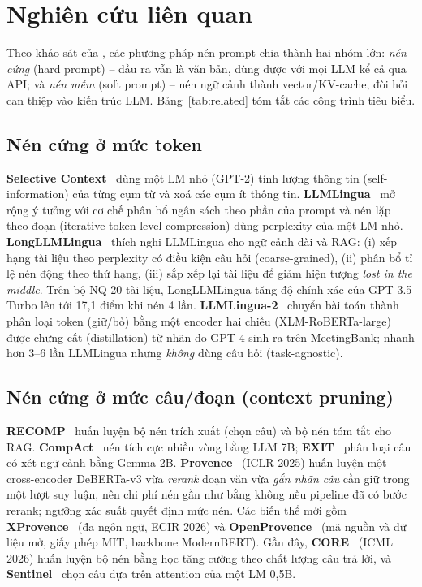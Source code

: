 \section{Nghiên cứu liên quan}
\label{sec:related}

Theo khảo sát của \citet{li2025survey}, các phương pháp nén prompt chia thành hai nhóm lớn:
\emph{nén cứng} (hard prompt) -- đầu ra vẫn là văn bản, dùng được với mọi LLM kể cả qua API; và
\emph{nén mềm} (soft prompt) -- nén ngữ cảnh thành vector/KV-cache, đòi hỏi can thiệp vào kiến trúc
LLM. Bảng~\ref{tab:related} tóm tắt các công trình tiêu biểu.

\subsection{Nén cứng ở mức token}

\textbf{Selective Context}~\cite{li2023selective} dùng một LM nhỏ (GPT-2) tính lượng thông tin
(self-information) của từng cụm từ và xoá các cụm ít thông tin. \textbf{LLMLingua}~\cite{jiang2023llmlingua}
mở rộng ý tưởng với cơ chế phân bổ ngân sách theo phần của prompt và nén lặp theo đoạn (iterative
token-level compression) dùng perplexity của một LM nhỏ. \textbf{LongLLMLingua}~\cite{jiang2024longllmlingua}
thích nghi LLMLingua cho ngữ cảnh dài và RAG: (i) xếp hạng tài liệu theo perplexity có điều kiện
câu hỏi (coarse-grained), (ii) phân bổ tỉ lệ nén động theo thứ hạng, (iii) sắp xếp lại tài liệu để
giảm hiện tượng \emph{lost in the middle}. Trên bộ NQ 20 tài liệu, LongLLMLingua tăng độ chính xác của
GPT-3.5-Turbo lên tới 17,1 điểm khi nén 4 lần. \textbf{LLMLingua-2}~\cite{pan2024llmlingua2} chuyển bài
toán thành phân loại token (giữ/bỏ) bằng một encoder hai chiều (XLM-RoBERTa-large) được chưng cất (distillation)
từ nhãn do GPT-4 sinh ra trên MeetingBank; nhanh hơn 3--6 lần LLMLingua nhưng \emph{không} dùng câu
hỏi (task-agnostic).

\subsection{Nén cứng ở mức câu/đoạn (context pruning)}

\textbf{RECOMP}~\cite{xu2024recomp} huấn luyện bộ nén trích xuất (chọn câu) và bộ nén tóm tắt cho RAG.
\textbf{CompAct}~\cite{yoon2024compact} nén tích cực nhiều vòng bằng LLM 7B; \textbf{EXIT}~\cite{hwang2025exit}
phân loại câu có xét ngữ cảnh bằng Gemma-2B. \textbf{Provence}~\cite{chirkova2025provence} (ICLR 2025)
huấn luyện một cross-encoder DeBERTa-v3 vừa \emph{rerank} đoạn văn vừa \emph{gắn nhãn câu} cần
giữ trong một lượt suy luận, nên chi phí nén gần như bằng không nếu pipeline đã có bước rerank;
ngưỡng xác suất quyết định mức nén. Các biến thể mới gồm \textbf{XProvence}~\cite{xprovence2026}
(đa ngôn ngữ, ECIR 2026) và \textbf{OpenProvence}~\cite{openprovence} (mã nguồn và dữ liệu mở, giấy
phép MIT, backbone ModernBERT). Gần đây, \textbf{CORE}~\cite{cui2025core} (ICML 2026) huấn luyện bộ nén
bằng học tăng cường theo chất lượng câu trả lời, và \textbf{Sentinel}~\cite{zhang2025sentinel} chọn câu
dựa trên attention của một LM 0,5B.

